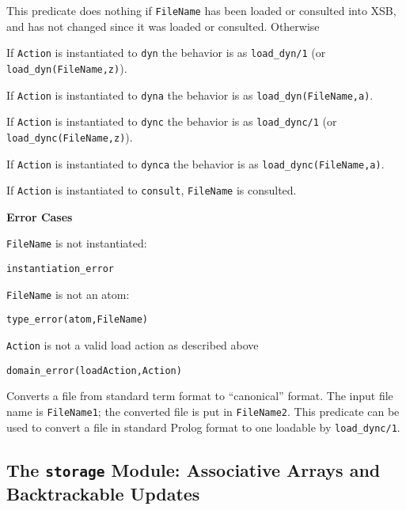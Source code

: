 \begin{description}
%
This predicate does nothing if {\tt FileName} has been loaded or
consulted into XSB, and has not changed since it was loaded or
consulted.  Otherwise
%
\bi
\item If {\tt Action} is instantiated to {\tt dyn} the behavior is as
{\tt load\_dyn/1} (or {\tt load\_dyn(FileName,z)}).

\item If {\tt Action} is instantiated to {\tt dyna} the behavior is as
{\tt load\_dyn(FileName,a)}.

\item If {\tt Action} is instantiated to {\tt dync} the behavior is as
{\tt load\_dync/1} (or {\tt load\_dync(FileName,z)}).

\item If {\tt Action} is instantiated to {\tt dynca} the behavior is as
{\tt load\_dync(FileName,a)}.

\item If {\tt Action} is instantiated to {\tt consult}, {\tt FileName}
is consulted.

\ei

{\bf Error Cases}
\bi
\item 	{\tt FileName} is not instantiated:
\bi
\item 	{\tt instantiation\_error}
\ei
\item 	{\tt FileName} is not an atom:
\bi
\item 	{\tt type\_error(atom,FileName)}
\ei
%
\item 	{\tt Action} is not a valid load action as described above
\bi
\item 	{\tt domain\_error(loadAction,Action)}
\ei
%
\ei

    Converts a file from standard term format to ``canonical'' format.
    The input file name is {\tt FileName1}; the converted file is put in
    {\tt FileName2}.  This predicate can be used to convert a file in
    standard Prolog format to one loadable by {\tt load\_dync/1}.
\end{description}


\subsection{The {\tt storage} Module: Associative Arrays and Backtrackable Updates}
\label{storage module}

